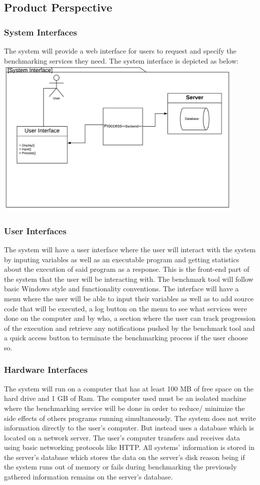 \documentclass[a4paper,12pt]{article}
\begin{document}
\subsection{Product Perspective}

\subsubsection{System Interfaces}
The system will provide a web interface for users to request and specify the benchmarking services they need. The system interface is depicted as below:\\
\includegraphics[width=12cm]{SI.jpeg}
\subsubsection{User Interfaces}
The system will have a user interface where the user will interact with the system by inputing variables as well as an executable program and getting statistics about the execution of said program as a response. This is the front-end part of the system that the user will be interacting with. The benchmark tool will follow basic Windows style and functionality conventions. The interface will have a menu where the user will be able to input their variables as well as to add source code that will be executed, a log button on the menu to see what services were done on the computer and by who, a section where the user can track progression of the execution and retrieve any notifications pushed by the benchmark tool and a quick access button to terminate the benchmarking process if the user choose so. 
\subsubsection{Hardware Interfaces}
The system will run on a computer that has at least 100 MB of free space on the hard drive and 1 GB of Ram. The computer used must be an isolated machine where the benchmarking service will be done in order to reduce/ minimize the side effects of others programs running simultaneously. The system does not write information directly to the user's computer. But instead uses a database which is located on a network server. The user's computer transfers and receives data using basic networking protocols like HTTP. All systems' information is stored in the server's database which stores the data on the server's disk reason being if the system runs out of memory or fails during benchmarking the previously gathered information remains on the server's database.
\end{document}
